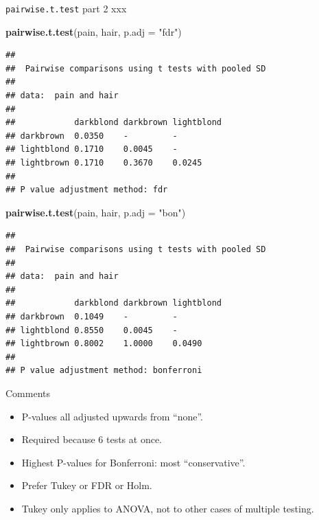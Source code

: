 \documentclass[ignorenonframetext,]{beamer}
\newenvironment{Shaded}{\begin{snugshade}}{\end{snugshade}}
\newcommand{\DataTypeTok}[1]{\textcolor[rgb]{0.13,0.29,0.53}{#1}}
\newcommand{\KeywordTok}[1]{\textcolor[rgb]{0.13,0.29,0.53}{\textbf{#1}}}
\newcommand{\NormalTok}[1]{#1}
\newcommand{\StringTok}[1]{\textcolor[rgb]{0.31,0.60,0.02}{#1}}
\begin{document}
\begin{frame}[fragile]{\texttt{pairwise.t.test} part 2 xxx}
\protect\hypertarget{pairwise.t.test-part-2-xxx}{}

\tiny

\begin{Shaded}
\begin{Highlighting}[]
\KeywordTok{pairwise.t.test}\NormalTok{(pain, hair, }\DataTypeTok{p.adj =} \StringTok{"fdr"}\NormalTok{)}
\end{Highlighting}
\end{Shaded}

\begin{verbatim}
## 
##  Pairwise comparisons using t tests with pooled SD 
## 
## data:  pain and hair 
## 
##            darkblond darkbrown lightblond
## darkbrown  0.0350    -         -         
## lightblond 0.1710    0.0045    -         
## lightbrown 0.1710    0.3670    0.0245    
## 
## P value adjustment method: fdr
\end{verbatim}

\begin{Shaded}
\begin{Highlighting}[]
\KeywordTok{pairwise.t.test}\NormalTok{(pain, hair, }\DataTypeTok{p.adj =} \StringTok{"bon"}\NormalTok{)}
\end{Highlighting}
\end{Shaded}

\begin{verbatim}
## 
##  Pairwise comparisons using t tests with pooled SD 
## 
## data:  pain and hair 
## 
##            darkblond darkbrown lightblond
## darkbrown  0.1049    -         -         
## lightblond 0.8550    0.0045    -         
## lightbrown 0.8002    1.0000    0.0490    
## 
## P value adjustment method: bonferroni
\end{verbatim}

\normalsize

\end{frame}

\begin{frame}{Comments}
\protect\hypertarget{comments-15}{}

\begin{itemize}
\item
  P-values all adjusted upwards from ``none''.
\item
  Required because 6 tests at once.
\item
  Highest P-values for Bonferroni: most ``conservative''.
\item
  Prefer Tukey or FDR or Holm.
\item
  Tukey only applies to ANOVA, not to other cases of multiple testing.
\end{itemize}

\end{frame}
\end{document}
